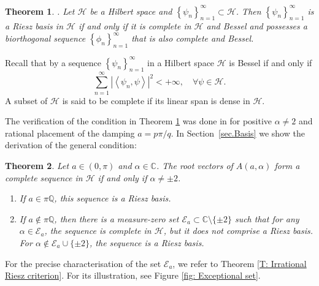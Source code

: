 \documentclass[11pt, a4paper,reqno]{amsart}
\theoremstyle{plain}
\newtheorem{theorem}{{Theorem}}[section]
\theoremstyle{definition}
\theoremstyle{remark}
\newcommand{\inner}[2]{\left\langle{#1}, {#2}\right\rangle}
\newcommand{\seq}[1]{\left\{#1_n\right\}_{n = 1}^{\infty}}
\newcommand{\1}{\mathds 1}
\begin{document}
\begin{theorem} \cite[Ch. 1, Theorem 9]{Young}. \label{RieszCriterion}
    Let $\mathcal H$ be a Hilbert space and $\seq{\psi} \subset \mathcal H$. Then $\seq{\psi}$ is a Riesz basis in $\mathcal H$ if and only if it is complete in $\mathcal H$ and Bessel and possesses a biorthogonal sequence $\seq{\phi}$ that is also complete and Bessel.
\end{theorem}

Recall that by \cite{Young} a sequence $\seq{\psi}$ in a Hilbert space $\mathcal H$ is Bessel if and only if 
\[
\sum_{n=1}^\infty\left|\inner{\psi_n}{\psi}\right|^2 < + \infty, \quad \forall \psi \in \mathcal H.
\]
A subset of $\mathcal H$ is said to be complete if its linear span is dense in $\mathcal H$.

The verification of the condition in Theorem \ref{RieszCriterion} was done in \cite{CH} for positive $\alpha \neq 2$ and rational placement of the damping $a = p\pi/q$. In Section~\ref{sec.Basis} we show the derivation of the general condition:

\begin{theorem}\label{Criterion}
    Let $a \in (0, \pi)$ and $\alpha \in \mathbb C$. The root vectors of $A(a, \alpha)$ form a complete sequence in $\mathcal H$ if and only if $\alpha \neq \pm 2$.
    \begin{enumerate}
        \item If $a \in \pi \mathbb Q$, this sequence is a Riesz basis.
        \item If $a \notin \pi\mathbb Q$, then there is a measure-zero set $\mathcal E_a \subset \mathbb C\setminus \{\pm 2\}$ such that for any $\alpha \in \mathcal E_a$, the sequence is complete in $\mathcal H$, but it does not comprise a Riesz basis. For $\alpha \notin \mathcal E_a \cup \{\pm 2\}$, the sequence is a Riesz basis.
    \end{enumerate}
\end{theorem}
For the precise characterisation of the set $\mathcal E_a$, we refer to Theorem \ref{T: Irrational Riesz criterion}. For its illustration, see Figure \ref{fig: Exceptional set}.
\end{document}
